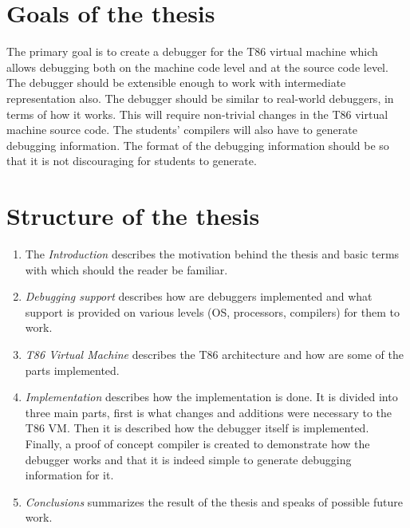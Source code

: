 \section{Goals of the thesis}
The primary goal is to create a debugger for the T86 virtual machine which
allows debugging both on the machine code level and at the source code level.
The debugger should be extensible enough to work with intermediate
representation also. The debugger should be similar to real-world debuggers, in
terms of how it works. This will require non-trivial changes in the T86 virtual
machine source code. The students' compilers will also have to generate
debugging information. The format of the debugging information should be so
that it is not discouraging for students to generate.

\section{Structure of the thesis}
\begin{enumerate}
    \item The \textit{Introduction} describes the motivation behind the thesis
        and basic terms with which should the reader be familiar.
    \item \textit{Debugging support} describes how are debuggers implemented
        and what support is provided on various levels (OS, processors,
        compilers) for them to work.
    \item \textit{T86 Virtual Machine} describes the T86 architecture and how
        are some of the parts implemented.
    \item \textit{Implementation} describes how the implementation is done. It
        is divided into three main parts, first is what changes and additions
        were necessary to the T86 VM. Then it is described how the debugger
        itself is implemented. Finally, a proof of concept compiler is created
        to demonstrate how the debugger works and that it is indeed simple to
        generate debugging information for it.
    \item \textit{Conclusions} summarizes the result of the thesis and speaks
        of possible future work.
\end{enumerate}

